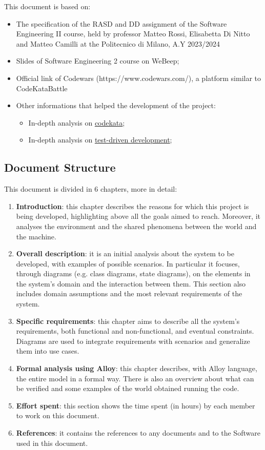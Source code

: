 This document is based on: 
\begin{itemize}
    \item The specification of the RASD and DD assignment of the Software Engineering II course, held by professor Matteo Rossi, Elisabetta Di Nitto and Matteo Camilli at the Politecnico di Milano, A.Y 2023/2024
    \item Slides of Software Engineering 2 course on WeBeep;
    \item Official link of Codewars (https://www.codewars.com/), a platform similar to CodeKataBattle
    \item Other informations that helped the development of the project: 
    \begin{itemize}
        \item In-depth analysis on \href{http://codekata.com/}{codekata};
        \item In-depth analysis on \href{https://en.wikipedia.org/wiki/Test-driven\textunderscore development}{test-driven development};
    \end{itemize}
\end{itemize}

\vspace{24pt}

\subsection{Document Structure}

This document is divided in 6 chapters, more in detail:
\begin{enumerate}
    \item \textbf{Introduction}: this chapter describes the reasons for which this project is being developed, highlighting above all the goals aimed to reach. Moreover, it analyses the environment and the shared phenomena between the world and the machine.
    \item \textbf{Overall description}: it is an initial analysis about the system to be developed, with examples of possible scenarios. In particular it focuses, through diagrams (e.g. class diagrams, state diagrams), on the elements in the system's domain and the interaction between them. This section also includes domain assumptions and the most relevant requirements of the system.
    \item \textbf{Specific requirements}: this chapter aims to describe all the system's requirements, both functional and non-functional, and eventual constraints. Diagrams are used to integrate requirements with scenarios and generalize them into use cases. 
    \item \textbf{Formal analysis using Alloy}: this chapter describes, with Alloy language, the entire model in a formal way. There is also an overview about what can be verified and some examples of the world obtained running the code.
    \item \textbf{Effort spent}: this section shows the time spent (in hours) by each member to work on this document.
    \item \textbf{References}: it contains the references to any documents and to the Software used in this document.
\end{enumerate}